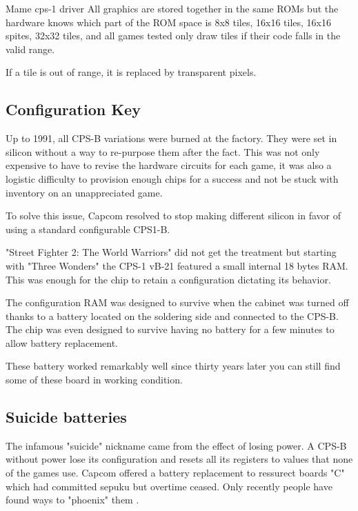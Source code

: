 \begin{q}{Mame cps-1 driver}
All graphics are
stored together in the same ROMs but the hardware knows which part of the ROM space
is 8x8 tiles, 16x16 tiles, 16x16 spites, 32x32 tiles, and all games tested only
draw tiles if their code falls in the valid range. 

If a tile is out of range, it is replaced by transparent pixels.
\end{q}

\subsection{Configuration Key}
Up to 1991, all CPS-B variations were burned at the factory. They were set in silicon without a way to re-purpose them after the fact. This was not only expensive to have to revise the hardware circuits for each game, it was also a logistic difficulty to provision enough chips for a success and not be stuck with inventory on an unappreciated game.

To solve this issue, Capcom resolved to stop making different silicon in favor of using a standard configurable CPS1-B.

"Street Fighter 2: The World Warriors" did not get the treatment but starting with "Three Wonders" the CPS-1 vB-21 featured a small internal 18 bytes RAM. This was enough for the chip to retain a configuration dictating its behavior\cite{petitSecurity}.

The configuration RAM was designed to survive when the cabinet was turned off thanks to a battery located  on the soldering side and connected to the CPS-B. The chip was even designed to survive having no battery for a few minutes to allow battery replacement.

\begin{trivia}
These battery worked remarkably well since thirty years later you can still find some of these board in working condition.
\end{trivia}

\subsection{Suicide batteries}
The infamous "suicide" nickname came from the effect of losing power. A CPS-B without power lose its configuration and resets all its registers to values that none of the games use. Capcom offered a battery replacement to ressurect boards "C" which had committed sepuku but overtime ceased. Only recently people have found ways to "phoenix" them .


